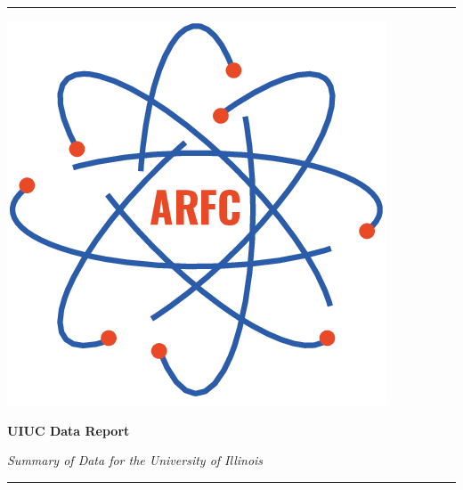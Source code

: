 \begin{titlepage} %
    \newcommand{\HRule}{\rule{\linewidth}{0.5mm}} %

    \center %

    \HRule
    \vspace{0.2cm}
     \begin{minipage}{0.4\textwidth}
        \includegraphics[width=\textwidth]{./arfc-logo.png}
        \end{minipage}%
        \begin{minipage}{0.6\textwidth}
        {\begin{flushright}\huge\bfseries UIUC Data Report
                           \end{flushright}}
        {\begin{flushright}\large\textit{Summary of Data for the University of Illinois}\end{flushright}}
        \end{minipage}

    \vspace{0.2cm}
    \HRule
    \vspace{0.5cm}


\end{titlepage}
